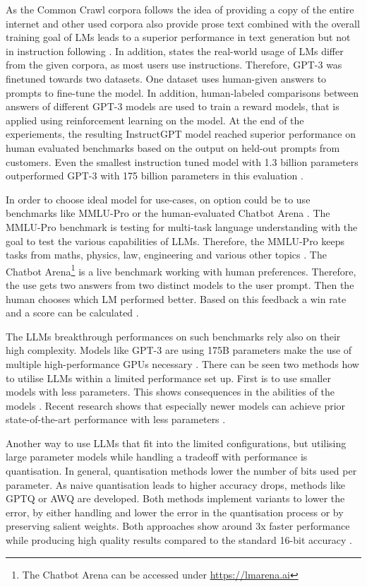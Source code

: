 \documentclass[a4paper,oneside,bibliography=totoc]{scrbook}
\begin{document}
As the Common Crawl corpora follows the idea of providing a copy of the entire internet \cite{CCF2025} and other used corpora also provide prose text combined with the overall training goal of \acp{LM} leads to a superior performance in text generation but not in instruction following \cite{Ouyang2022}. In addition, \citet{Ouyang2022} states the real-world usage of \acp{LM} differ from the given corpora, as most users use instructions. Therefore, \ac{GPT}-3 was finetuned towards two datasets. One dataset uses human-given answers to prompts to fine-tune the model. In addition, human-labeled comparisons between answers of different \ac{GPT}-3 models are used to train a reward models, that is applied using reinforcement learning on the model. At the end of the experiements, the resulting InstructGPT model reached superior performance on human evaluated benchmarks based on the output on held-out prompts from customers. Even the smallest instruction tuned model with 1.3 billion parameters outperformed \ac{GPT}-3 with 175 billion parameters in this evaluation \cite{Ouyang2022}.

In order to choose ideal model for use-cases, on option could be to use benchmarks like MMLU-Pro \cite{Wang2024} or the human-evaluated Chatbot Arena \cite{Chiang2024}. The MMLU-Pro benchmark is testing for multi-task language understanding with the goal to test the various capabilities of LLMs. Therefore, the MMLU-Pro keeps tasks from maths, physics, law, engineering and various other topics \cite{Wang2024}. The Chatbot Arena\footnote{The Chatbot Arena can be accessed under \url{https://lmarena.ai}} is a live benchmark working with human preferences. Therefore, the use gets two answers from two distinct models to the user prompt. Then the human chooses which \ac{LM} performed better. Based on this feedback a win rate and a score can be calculated \cite{Chiang2024}.

The \acp{LLM} breakthrough performances on such benchmarks rely also on their high complexity. Models like GPT-3 are using 175B parameters make the use of multiple high-performance GPUs necessary \cite{Brown2020,Frantar2023}. There can be seen two methods how to utilise \acp{LLM} within a limited performance set up. First is to use smaller models with less parameters. This shows consequences in the abilities of the models \cite{Brown2020,Grattafiori2024}. Recent research shows that especially newer models can achieve prior state-of-the-art performance with less parameters \cite{Meta2024}.

Another way to use \acp{LLM} that fit into the limited configurations, but utilising large parameter models while handling a tradeoff with performance is quantisation. In general, quantisation methods lower the number of bits used per parameter. As naive quantisation leads to higher accuracy drops, methods like GPTQ or AWQ are developed. Both methods implement variants to lower the error, by either handling and lower the error in the quantisation process or by preserving salient weights. Both approaches show around 3x faster performance while producing high quality results compared to the standard 16-bit accuracy \cite{Frantar2023,Lin2024}.
\end{document}
